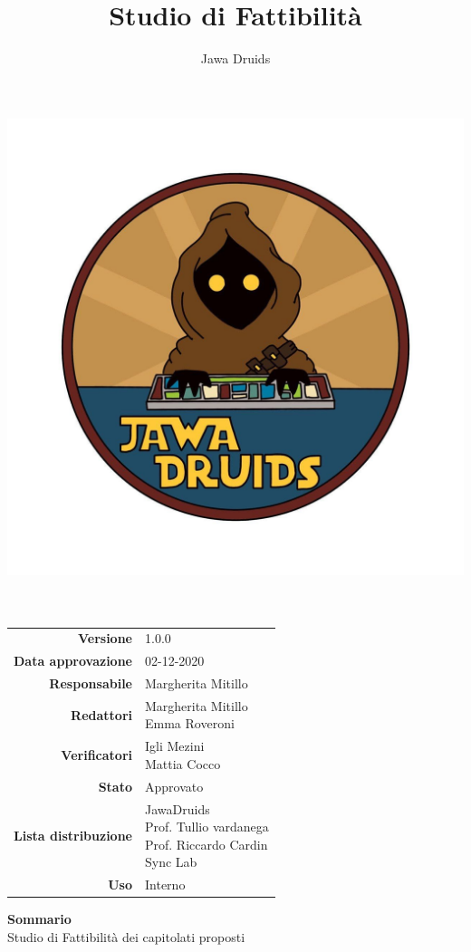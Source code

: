 



	
	\makeatletter
	\begin{titlepage}
		\begin{center}
			\vspace*{-4cm}
			\author{Jawa Druids} 
			\title{Studio di Fattibilità}
			\date{} %
			\includegraphics[width=0.5\linewidth]{../immagini/DRUIDSLOGO.jpg}\\[4ex]
			{\huge \bfseries  \@title }\\[2ex] 
			{\LARGE  \@author}\\[50ex]
			\vspace*{-9cm}
			\begin{table}[H]
				\renewcommand{\arraystretch}{1.4}
				\centering
				\begin{tabular}{r | l}
					\textbf{Versione} & 1.0.0 \\%
					\textbf{Data approvazione} & 02-12-2020\\
					\textbf{Responsabile} & Margherita Mitillo \\
					\textbf{Redattori} & \makecell[tl]{Margherita Mitillo \\ Emma Roveroni} \\
					\textbf{Verificatori} & \makecell[tl]{Igli Mezini \\ Mattia Cocco} \\
					\textbf{Stato} & Approvato\\
					\textbf{Lista distribuzione} & \makecell[tl]{JawaDruids \\ Prof. Tullio vardanega \\ Prof. Riccardo Cardin \\ Sync Lab}\\
					\textbf{Uso} & Interno
				\end{tabular}
			\end{table}
			\vspace{0.1cm}
			\hfill \break
			\fontsize{17}{10}\textbf{Sommario} \\
			\vspace{0.1cm}
			Studio di Fattibilità dei capitolati proposti 
		\end{center}
	\end{titlepage}
	\makeatother
	

